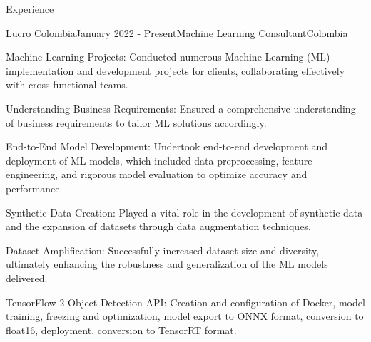 \documentclass{resume} %
\begin{document}
\begin{rSection}{Experience}
        \begin{rSubsection}{Lucro Colombia}{January 2022 - Present}{Machine Learning Consultant}{Colombia}
            {\normalfont 
            \item Machine Learning Projects: Conducted numerous Machine Learning (ML) implementation and development projects for clients, collaborating effectively with cross-functional teams.
            \item Understanding Business Requirements: Ensured a comprehensive understanding of business requirements to tailor ML solutions accordingly.
            \item End-to-End Model Development: Undertook end-to-end development and deployment of ML models, which included data preprocessing, feature engineering, and rigorous model evaluation to optimize accuracy and performance.
            \item Synthetic Data Creation: Played a vital role in the development of synthetic data and the expansion of datasets through data augmentation techniques.
            \item Dataset Amplification: Successfully increased dataset size and diversity, ultimately enhancing the robustness and generalization of the ML models delivered.
            \item TensorFlow 2 Object Detection API: Creation and configuration of Docker, model training, freezing and optimization, model export to ONNX format, conversion to float16, deployment, conversion to TensorRT format.
            }
        \end{rSubsection}


\end{rSection}
\end{document}
